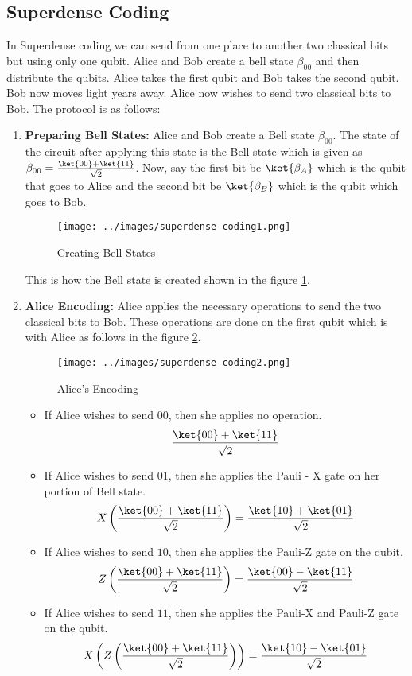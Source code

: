 \documentclass[12pt, oneside]{book}
\theoremstyle{definition}
\theoremstyle{definition}
\theoremstyle{remark}
\begin{document}
\subsection{Superdense Coding}
In Superdense coding we can send from one place to another two classical bits but using only one qubit. 
Alice and Bob create a bell state $\beta_{00}$ and then distribute the qubits. Alice takes the first qubit and Bob takes the second qubit.
Bob now moves light years away. Alice now wishes to send two classical bits to Bob. The protocol is as follows:
\begin{enumerate}
    \item \textbf{Preparing Bell States: }Alice and Bob create a Bell state $\beta_{00}$.
    The state of the circuit after applying this state is the Bell state which is given as $\beta_{00}=\frac{\ket{00}+\ket{11}}{\sqrt{2}}$.
    Now, say the first bit be $\ket{\beta_A}$ which is the qubit that goes to Alice and the second bit be $\ket{\beta_B}$ which is the qubit which goes to Bob.
    \begin{figure}[H]
        \centering
        \texttt{[image: ../images/superdense-coding1.png]}
        \caption{Creating Bell States}
        \label{fig:superdense1}
    \end{figure}
    This is how the Bell state is created shown in the figure \ref{fig:superdense1}.
    \item \textbf{Alice Encoding: } Alice applies the necessary operations to send the two classical bits to Bob.
    These operations are done on the first qubit which is with Alice as follows in the figure \ref{fig:superdense2}.
    \begin{figure}[H]
        \centering
        \texttt{[image: ../images/superdense-coding2.png]}
        \caption{Alice's Encoding}
        \label{fig:superdense2}
    \end{figure}
    \begin{itemize}
        \item If Alice wishes to send $00$, then she applies no operation.
        \[
            \frac{\ket{00}+\ket{11}}{\sqrt{2}}
        \]
        \item If Alice wishes to send $01$, then she applies the Pauli - X gate on her portion of Bell state.
        \[
            X\left(\frac{\ket{00}+\ket{11}}{\sqrt{2}}\right)=\frac{\ket{10}+\ket{01}}{\sqrt{2}}
        \]
        \item If Alice wishes to send $10$, then she applies the Pauli-Z gate on the qubit.
        \[
            Z\left(\frac{\ket{00}+\ket{11}}{\sqrt{2}}\right)=\frac{\ket{00}-\ket{11}}{\sqrt{2}}
        \]
        \item If Alice wishes to send $11$, then she applies the Pauli-X and Pauli-Z gate on the qubit.
        \[
            X\left(Z\left(\frac{\ket{00}+\ket{11}}{\sqrt{2}}\right)\right)=\frac{\ket{10}-\ket{01}}{\sqrt{2}}
        \]


\end{itemize}
\end{enumerate}
\end{document}
